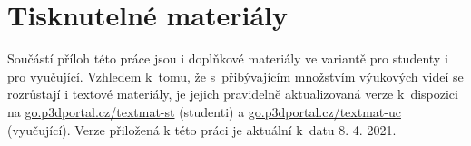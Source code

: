 \chapter{Tisknutelné materiály}
Součástí příloh této práce jsou i doplňkové materiály ve variantě pro studenty i pro vyučující.
Vzhledem k~tomu, že s~přibývajícím množstvím výukových videí se rozrůstají i textové materiály, je jejich pravidelně aktualizovaná verze k~dispozici na \href{https://go.p3dportal.cz/textmat-st}{go.p3dportal.cz/textmat-st} (studenti) a \href{https://go.p3dportal.cz/textmat-uc}{go.p3dportal.cz/textmat-uc} (vyučující).
Verze přiložená k této práci je aktuální k~datu 8. 4. 2021.
